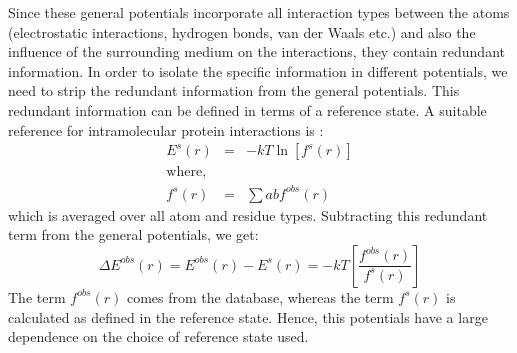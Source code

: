 \par
Since these general potentials incorporate all interaction types between the atoms (electrostatic interactions, hydrogen bonds, van der Waals etc.) and also the influence of the surrounding medium on the interactions, they contain redundant information. In order to isolate the specific information in different potentials, we need to strip the redundant information from the general potentials. This redundant information can be defined in terms of a reference state. A suitable reference for intramolecular protein interactions is \citep{Sippl1990}:
\begin{eqnarray}
E^{s}(r) &=& -kT\ln[f^{s}(r)] \\
\mathrm{where,} \nonumber \\
f^{s}(r) &=& \sum\limits{ab}f^{obs}(r)
\end{eqnarray}
which is averaged over all atom and residue types. Subtracting this redundant term from the general potentials, we get:
\begin{equation}
\Delta E^{obs}(r) = E^{obs}(r) - E^{s}(r) = -kT \left[ \dfrac{f^{obs}(r)}{f^{s}(r)} \right] 
\end{equation}
The term $f^{obs}(r)$ comes from the database, whereas the term $f^{s}(r)$ is calculated as defined in the reference state. Hence, this potentials have a large dependence on the choice of reference state used.

